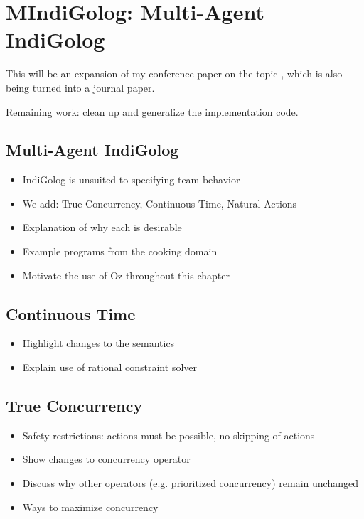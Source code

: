 \chapter{MIndiGolog: Multi-Agent IndiGolog}\label{ch:mindigolog}

This will be an expansion of my conference paper on the topic \cite{kelly06hlp_dps}, which is also being turned into a journal paper.

Remaining work: clean up and generalize the implementation code.

\section{Multi-Agent IndiGolog}
\begin{itemize}
\item IndiGolog is unsuited to specifying team behavior
\item We add: True Concurrency, Continuous Time, Natural Actions
\item Explanation of why each is desirable
\item Example programs from the cooking domain
\item Motivate the use of Oz throughout this chapter
\end{itemize}

\section{Continuous Time}
\begin{itemize}
\item Highlight changes to the semantics
\item Explain use of rational constraint solver
\end{itemize}

\section{True Concurrency}
\begin{itemize}
\item Safety restrictions: actions must be possible, no skipping of actions
\item Show changes to concurrency operator
\item Discuss why other operators (e.g. prioritized concurrency) remain unchanged
\item Ways to maximize concurrency
\end{itemize}

